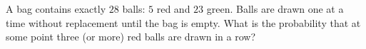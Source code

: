 A bag contains exactly $28$ balls: $5$ red and $23$ green. Balls are drawn one at a time without replacement until the bag is empty. What is the probability that at some point three (or more) red balls are drawn in a row?
